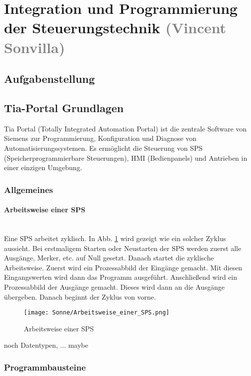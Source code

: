 \section{Integration und Programmierung der Steuerungstechnik \textcolor{gray}{ (Vincent Sonvilla)}}


\subsection{Aufgabenstellung}


\subsection{Tia-Portal Grundlagen}

Tia Portal (Totally Integrated Automation Portal) ist die zentrale Software von Siemens zur Programmierung, Konfiguration und Diagnose von Automatisierungssystemen. Es ermöglicht die Steuerung von SPS (Speicherprogrammierbare Steuerungen), HMI (Bedienpanels) und Antrieben in einer einzigen Umgebung.

    \subsubsection{Allgemeines}

        \paragraph{Arbeitsweise einer SPS} \mbox{} \\
        Eine SPS arbeitet zyklisch. In Abb. \ref{Arbeitsweise_einer_SPS} wird gezeigt wie ein solcher Zyklus aussieht. Bei erstmaligem Starten oder Neustarten der SPS werden zuerst alle Ausgänge, Merker, etc. auf Null gesetzt. Danach startet die zyklische Arbeitsweise. Zuerst wird ein Prozessabbild der Eingänge gemacht. Mit diesen Eingangswerten wird dann das Programm ausgeführt. Anschließend wird ein Prozessabbild der Ausgänge gemacht. Dieses wird dann an die Ausgänge übergeben. Danach beginnt der Zyklus von vorne. \cite{Arbeitsweise_der_SPS}
        \begin{figure}[h]
            \texttt{[image: Sonne/Arbeitsweise\_einer\_SPS.png]}
            \caption{Arbeitsweise einer SPS \cite{Arbeitsweise_der_SPS}}
            \label{Arbeitsweise_einer_SPS}
        \end{figure}

        noch Datentypen, ... maybe

    \subsubsection{Programmbausteine}
    
